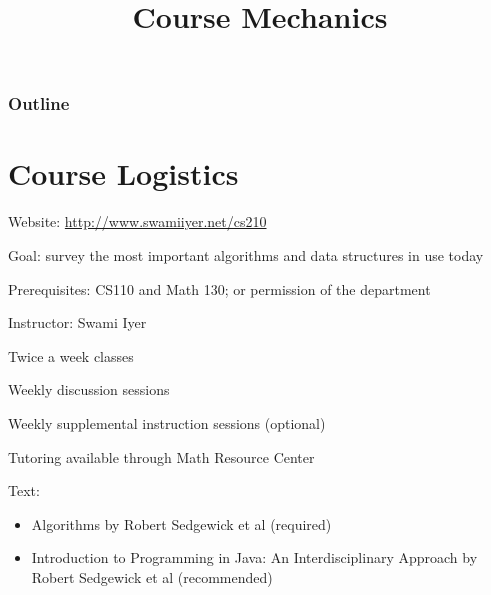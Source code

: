 \documentclass[8pt,a4paper,compress]{beamer}
\title{Course Mechanics}
\date{}
\begin{document}
\begin{frame}
\vfill
\titlepage
\end{frame}

\begin{frame}
\frametitle{Outline}
\tableofcontents
\end{frame}

\section{Course Logistics}
\begin{frame}[fragile]
Website: \href{http://www.swamiiyer.net/cs210}{http://www.swamiiyer.net/cs210}

\bigskip

Goal: survey the most important algorithms and data structures in use today

\bigskip

Prerequisites: CS110 and Math 130; or permission of the department

\bigskip

Instructor: Swami Iyer

\bigskip

Twice a week classes

\bigskip
Weekly discussion sessions

\bigskip

Weekly supplemental instruction sessions (optional)

\bigskip

Tutoring available through Math Resource Center

\bigskip

Text: 
\begin{itemize}
\item Algorithms by Robert Sedgewick et al (required)
\item Introduction to Programming in Java: An Interdisciplinary Approach  by Robert Sedgewick et al (recommended)
\end{itemize}
\end{frame}
\end{document}
